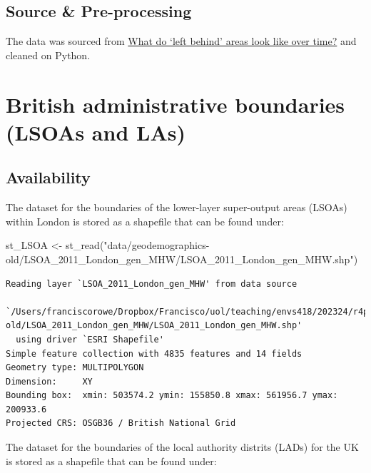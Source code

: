 \documentclass[
  letterpaper,
  DIV=11,
  numbers=noendperiod]{scrreprt}
\newenvironment{Shaded}{\begin{snugshade}}{\end{snugshade}}
\newcommand{\FunctionTok}[1]{\textcolor[rgb]{0.28,0.35,0.67}{#1}}
\newcommand{\NormalTok}[1]{\textcolor[rgb]{0.00,0.23,0.31}{#1}}
\newcommand{\OtherTok}[1]{\textcolor[rgb]{0.00,0.23,0.31}{#1}}
\newcommand{\StringTok}[1]{\textcolor[rgb]{0.13,0.47,0.30}{#1}}
\begin{document}
\hypertarget{source-pre-processing}{%
\subsection*{Source \& Pre-processing}\label{source-pre-processing}}

The data was sourced from
\href{https://github.com/GDSL-UL/APPG-LBA/blob/main/README.md}{What do
`left behind' areas look like over time?} and cleaned on Python.

\hypertarget{british-administrative-boundaries-lsoas-and-las}{%
\section{British administrative boundaries (LSOAs and
LAs)}\label{british-administrative-boundaries-lsoas-and-las}}

\hypertarget{availability-1}{%
\subsection*{Availability}\label{availability-1}}

The dataset for the boundaries of the lower-layer super-output areas
(LSOAs) within London is stored as a shapefile that can be found under:

\begin{Shaded}
\begin{Highlighting}[]
\NormalTok{st\_LSOA }\OtherTok{\textless{}{-}} \FunctionTok{st\_read}\NormalTok{(}\StringTok{"data/geodemographics{-}old/LSOA\_2011\_London\_gen\_MHW/LSOA\_2011\_London\_gen\_MHW.shp"}\NormalTok{)}
\end{Highlighting}
\end{Shaded}

\begin{verbatim}
Reading layer `LSOA_2011_London_gen_MHW' from data source 
  `/Users/franciscorowe/Dropbox/Francisco/uol/teaching/envs418/202324/r4ps/data/geodemographics-old/LSOA_2011_London_gen_MHW/LSOA_2011_London_gen_MHW.shp' 
  using driver `ESRI Shapefile'
Simple feature collection with 4835 features and 14 fields
Geometry type: MULTIPOLYGON
Dimension:     XY
Bounding box:  xmin: 503574.2 ymin: 155850.8 xmax: 561956.7 ymax: 200933.6
Projected CRS: OSGB36 / British National Grid
\end{verbatim}

The dataset for the boundaries of the local authority distrits (LADs)
for the UK is stored as a shapefile that can be found under:
\end{document}
